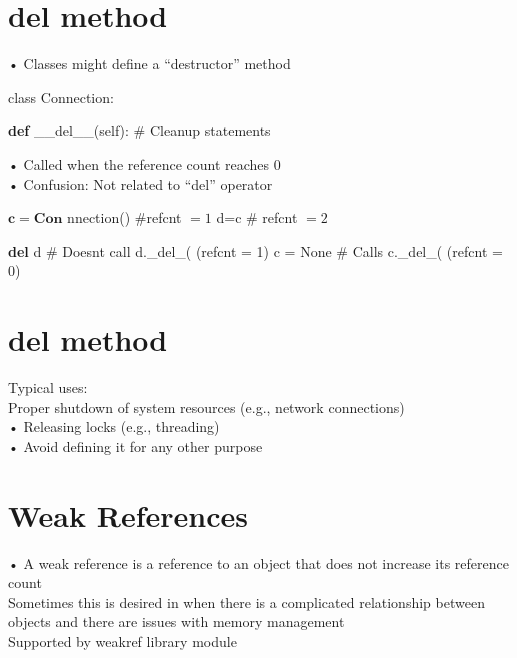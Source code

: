 \documentclass[
  letterpaper,
  DIV=11,
  numbers=noendperiod]{scrreprt}
\newenvironment{Shaded}{\begin{snugshade}}{\end{snugshade}}
\newcommand{\CommentTok}[1]{\textcolor[rgb]{0.37,0.37,0.37}{#1}}
\newcommand{\FunctionTok}[1]{\textcolor[rgb]{0.28,0.35,0.67}{#1}}
\newcommand{\KeywordTok}[1]{\textcolor[rgb]{0.00,0.23,0.31}{\textbf{#1}}}
\newcommand{\NormalTok}[1]{\textcolor[rgb]{0.00,0.23,0.31}{#1}}
\newcommand{\OperatorTok}[1]{\textcolor[rgb]{0.37,0.37,0.37}{#1}}
\newcommand{\VariableTok}[1]{\textcolor[rgb]{0.07,0.07,0.07}{#1}}
\begin{document}
\chapter{del method}\label{del-method}

• Classes might define a ``destructor'' method

class Connection:

\begin{Shaded}
\begin{Highlighting}[]
\KeywordTok{def} \FunctionTok{\_\_del\_\_}\NormalTok{(}\VariableTok{self}\NormalTok{):}
    \CommentTok{\# Cleanup statements }
\end{Highlighting}
\end{Shaded}

• Called when the reference count reaches 0\\
• Confusion: Not related to ``del'' operator

\(\mathbf{c} = \mathbf{\text{Con}}\) nnection() \#refcnt \(= 1\) d=c \#
refcnt \(= 2\)

\begin{Shaded}
\begin{Highlighting}[]
\KeywordTok{del}\NormalTok{ d }\CommentTok{\# Doesn\textquotesingle{}t call d.\_del\_( (refcnt = 1)  }
\NormalTok{c }\OperatorTok{=} \VariableTok{None} \CommentTok{\# Calls c.\_del\_( (refcnt = 0) }
\end{Highlighting}
\end{Shaded}


\chapter{del method}\label{del-method-1}

Typical uses:\\
Proper shutdown of system resources (e.g., network connections)\\
• Releasing locks (e.g., threading)\\
• Avoid defining it for any other purpose


\chapter{Weak References}\label{weak-references}

• A weak reference is a reference to an object that does not increase
its reference count\\
Sometimes this is desired in when there is a complicated relationship
between objects and there are issues with memory management\\
Supported by weakref library module
\end{document}
